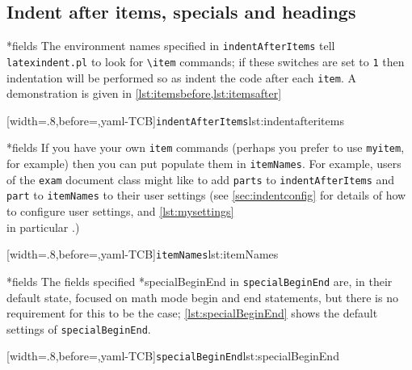 \documentclass[10pt]{article}
\begin{document}
\subsection{Indent after items, specials and headings}
*{fields}
 The environment names specified in \texttt{indentAfterItems} tell
 \texttt{latexindent.pl} to look for \lstinline!\item! commands; if these switches are
 set to \texttt{1} then indentation will be performed so as indent the code after each
 \texttt{item}. A demonstration is given in \cref{lst:itemsbefore,lst:itemsafter}

 \begin{cmhtcbraster}[raster columns=3,
   raster left skip=-3.5cm,
   raster right skip=-2cm,
   raster column skip=.03\linewidth]
  [width=.8\linewidth,before=\centering,yaml-TCB]{\texttt{indentAfterItems}}{lst:indentafteritems}
 \end{cmhtcbraster}

*{fields}
 If you have your own \texttt{item} commands (perhaps you prefer to use \texttt{myitem},
 for example) then you can put populate them in \texttt{itemNames}. For example, users of
 the \texttt{exam} document class might like to add \texttt{parts} to
 \texttt{indentAfterItems} and \texttt{part} to \texttt{itemNames} to their user settings
 (see \vref{sec:indentconfig} for details of how to configure user settings, and
 \vref{lst:mysettings} \\ in particular \label{page:examsettings}.)

 [width=.8\linewidth,before=\centering,yaml-TCB]{\texttt{itemNames}}{lst:itemNames}

*{fields}\label{yaml:specialBeginEnd}
 The fields specified 
 *{specialBeginEnd} in \texttt{specialBeginEnd} are, in their
 default state, focused on math mode begin and end statements, but there is no
 requirement for this to be the case; \cref{lst:specialBeginEnd} shows the default
 settings of \texttt{specialBeginEnd}. %

 [width=.8\linewidth,before=\centering,yaml-TCB]{\texttt{specialBeginEnd}}{lst:specialBeginEnd}
\end{document}
